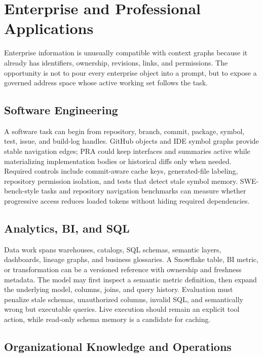 \documentclass[11pt]{article}
\begin{document}
\section{Enterprise and Professional Applications}

Enterprise information is unusually compatible with context graphs because it already has identifiers, ownership, revisions, links, and permissions. The opportunity is not to pour every enterprise object into a prompt, but to expose a governed address space whose active working set follows the task.

\subsection{Software Engineering}

A software task can begin from repository, branch, commit, package, symbol, test, issue, and build-log handles. GitHub objects and IDE symbol graphs provide stable navigation edges; PRA could keep interfaces and summaries active while materializing implementation bodies or historical diffs only when needed. Required controls include commit-aware cache keys, generated-file labeling, repository permission isolation, and tests that detect stale symbol memory. SWE-bench-style tasks and repository navigation benchmarks can measure whether progressive access reduces loaded tokens without hiding required dependencies.

\subsection{Analytics, BI, and SQL}

Data work spans warehouses, catalogs, SQL schemas, semantic layers, dashboards, lineage graphs, and business glossaries. A Snowflake table, BI metric, or transformation can be a versioned reference with ownership and freshness metadata. The model may first inspect a semantic metric definition, then expand the underlying model, columns, joins, and query history. Evaluation must penalize stale schemas, unauthorized columns, invalid SQL, and semantically wrong but executable queries. Live execution should remain an explicit tool action, while read-only schema memory is a candidate for caching.

\subsection{Organizational Knowledge and Operations}
\end{document}
